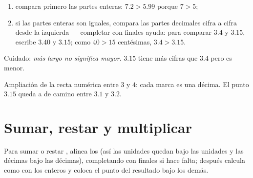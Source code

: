\begin{method}\label{met:g6:decimals:compare}
\begin{enumerate}
  \item compara primero las partes enteras: $7.2 > 5.99$ porque $7 > 5$;
  \item si las partes enteras son iguales, compara las partes decimales cifra a
        cifra desde la izquierda --- completar con  finales ayuda:
        para comparar $3.4$ y $3.15$, escribe $3.40$ y $3.15$;
        como $40 > 15$ centésimas, $3.4 > 3.15$.
\end{enumerate}
Cuidado: \emph{más largo no significa mayor}. $3.15$ tiene más cifras que
$3.4$ pero es menor.
\end{method}

\begin{omfigure}

{\small Ampliación de la recta numérica entre $3$ y $4$: cada marca es una
décima. El punto $3.15$ queda a  de camino entre $3.1$ y $3.2$.}
\end{omfigure}

\section{Sumar, restar y multiplicar}

\begin{method}\label{met:g6:decimals:columns}
Para sumar o restar , alinea los \emph{}
(así las unidades quedan bajo las unidades y las décimas bajo las décimas), completando con
 finales si hace falta; después calcula como con los enteros y coloca el punto
del resultado bajo los demás.
\end{method}

